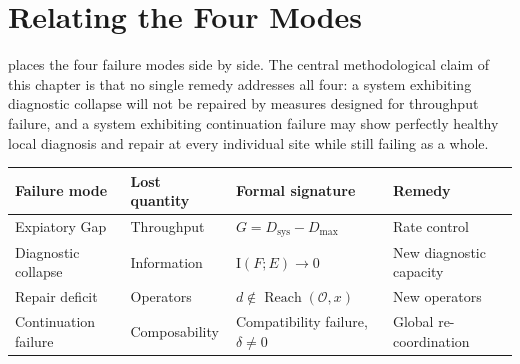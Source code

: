 \documentclass[12pt]{report}
\newcommand{\I}{\ensuremath{\mathrm{I}}}
\begin{document}
\section{Relating the Four Modes}
\label{sec:relating}

 places the four failure modes side by side. The
central methodological claim of this chapter is that no single remedy
addresses all four: a system exhibiting diagnostic collapse will not be
repaired by measures designed for throughput failure, and a system
exhibiting continuation failure may show perfectly healthy local
diagnosis and repair at every individual site while still failing as a
whole.

\begin{center}
\begin{tabular}{llll}
\hline
Failure mode & Lost quantity & Formal signature & Remedy \\
\hline
Expiatory Gap & Throughput & $G = D_{\mathrm{sys}} - D_{\max}$ & Rate control \\
Diagnostic collapse & Information & $\I(F;E)\to 0$ & New diagnostic capacity \\
Repair deficit & Operators & $d \notin \operatorname{Reach}(\mathcal{O}, x)$ & New operators \\
Continuation failure & Composability & Compatibility failure, $\delta \neq 0$ & Global re-coordination \\
\hline
\end{tabular}
\label{tab:summary}
\end{center}
\end{document}
